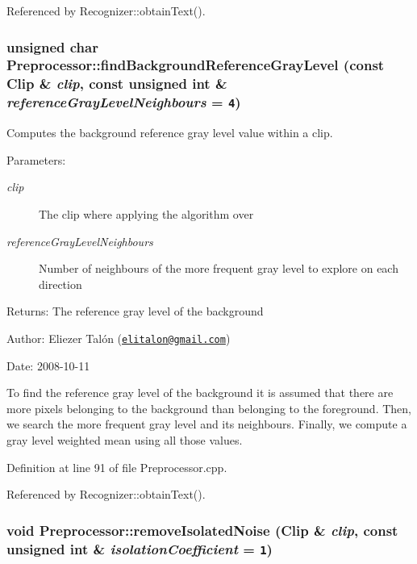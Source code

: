 Referenced by Recognizer::obtainText().\hypertarget{class_preprocessor_19aa90451cf6f99854833c05d3e71270}{
\subsubsection[findBackgroundReferenceGrayLevel]{\setlength{\rightskip}{0pt plus 5cm}unsigned char Preprocessor::findBackgroundReferenceGrayLevel (const {\bf Clip} \& {\em clip}, \/  const unsigned int \& {\em referenceGrayLevelNeighbours} = {\tt 4})}}
\label{class_preprocessor_19aa90451cf6f99854833c05d3e71270}


Computes the background reference gray level value within a clip. 

\begin{Desc}
\item[Parameters:]
\begin{description}
\item[{\em clip}]The clip where applying the algorithm over \item[{\em referenceGrayLevelNeighbours}]Number of neighbours of the more frequent gray level to explore on each direction\end{description}
\end{Desc}
\begin{Desc}
\item[Returns:]The reference gray level of the background\end{Desc}
\begin{Desc}
\item[Author:]Eliezer Talón (\href{mailto:elitalon@gmail.com}{\tt elitalon@gmail.com}) \end{Desc}
\begin{Desc}
\item[Date:]2008-10-11\end{Desc}
To find the reference gray level of the background it is assumed that there are more pixels belonging to the background than belonging to the foreground. Then, we search the more frequent gray level and its neighbours. Finally, we compute a gray level weighted mean using all those values. 

Definition at line 91 of file Preprocessor.cpp.

Referenced by Recognizer::obtainText().\hypertarget{class_preprocessor_a365f69af48cae608071e9943f300dd5}{
\subsubsection[removeIsolatedNoise]{\setlength{\rightskip}{0pt plus 5cm}void Preprocessor::removeIsolatedNoise ({\bf Clip} \& {\em clip}, \/  const unsigned int \& {\em isolationCoefficient} = {\tt 1})}}
\label{class_preprocessor_a365f69af48cae608071e9943f300dd5}


